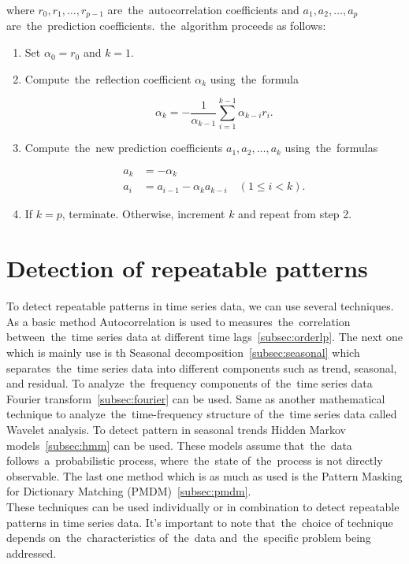 where $r_0, r_1, \ldots, r_{p-1}$ are~the~autocorrelation coefficients and $a_1, a_2, \ldots, a_p$ are~the~prediction coefficients.~the~algorithm proceeds as follows:\\

\begin{enumerate}
    \item Set $\alpha_0 = r_0$ and $k = 1$.
    \item Compute~the~reflection coefficient $\alpha_k$ using~the~formula

    \begin{equation*}
        \alpha_k = -\frac{1}{\alpha_{k-1}} \sum_{i=1}^{k-1} \alpha_{k-i} r_i.
    \end{equation*}

    \item Compute~the~new prediction coefficients $a_1, a_2, \ldots, a_k$ using~the~formulas

    \begin{align*}
        a_k &= -\alpha_k \\
        a_i &= a_{i-1} - \alpha_k a_{k-i} \quad (1 \leq i < k).
    \end{align*}

    \item If $k = p$, terminate. Otherwise, increment $k$ and repeat from step 2.
\end{enumerate}


\section{Detection of repeatable patterns}\label{sec:patterns}
To detect repeatable patterns in time series data, we can use several techniques. As a basic method Autocorrelation is used to measures~the~correlation between~the~time series data at different time lags~\ref{subsec:orderlp}. The next one which is mainly use is th Seasonal decomposition~\ref{subsec:seasonal} which separates~the~time series data into different components
such as trend, seasonal, and residual. To analyze~the~frequency components of~the~time series data Fourier transform~\ref{subsec:fourier} can be used. Same as another mathematical technique to analyze~the~time-frequency structure of~the~time series data called Wavelet analysis.
To detect pattern in seasonal trends Hidden Markov models~\ref{subsec:hmm} can be used.
These models assume that~the~data follows~a~probabilistic process, where~the~state of~the~process is not directly observable. The last one method which is as much as used is the Pattern Masking for Dictionary Matching (PMDM)~\ref{subsec:pmdm}.\\
These techniques can be used individually or in combination to detect repeatable patterns in time series data. It's important to note that~the~choice of technique depends on~the~characteristics of~the~data and~the~specific problem being addressed.



